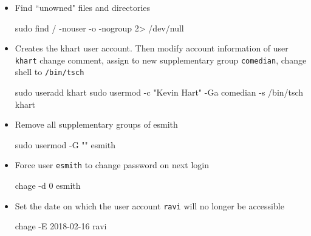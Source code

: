 \begin{itemize}
\item Find ``unowned" files and directories
\begin{commandshell}
sudo find / -nouser -o -nogroup 2> /dev/null
\end{commandshell}

\item Creates the khart user account. Then modify account information of user \verb|khart| change comment, assign to new supplementary group \verb|comedian|, change shell to \verb|/bin/tsch|
\begin{commandshell}
sudo useradd khart
sudo usermod -c "Kevin Hart" -Ga comedian -s /bin/tsch khart
\end{commandshell}

\item Remove all supplementary groups of esmith
\begin{commandshell}
sudo usermod -G "" esmith
\end{commandshell}

\item Force user \verb|esmith| to change password on next login
\begin{commandshell}
chage -d 0 esmith
\end{commandshell}

\item Set the date on which the user account \verb|ravi| will no longer be accessible
\begin{commandshell}
chage -E 2018-02-16 ravi
\end{commandshell}


\end{itemize}